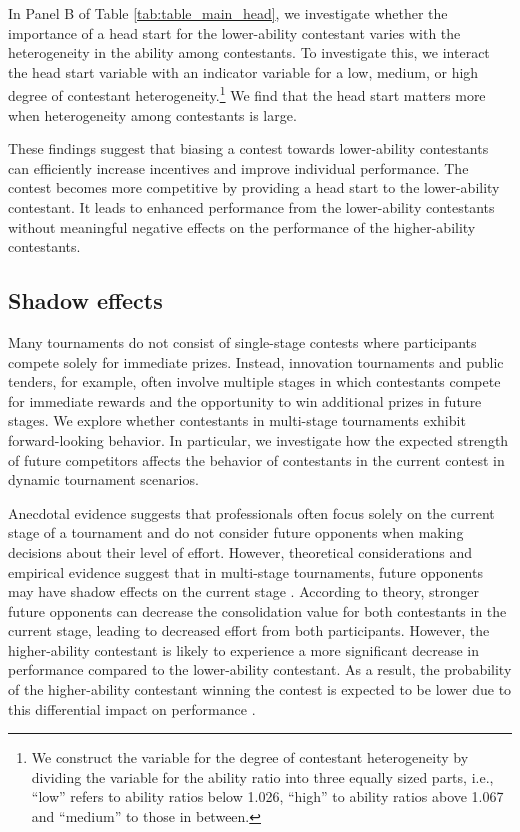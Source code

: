 \documentclass[11pt,a4paper]{article}
\begin{document}
In Panel B of Table \ref{tab:table_main_head}, we investigate whether the importance of a head start for the lower-ability contestant varies with the heterogeneity in the ability among contestants. To investigate this, we interact the head start variable with an indicator variable for a low, medium, or high degree of contestant heterogeneity.\footnote{We construct the variable for the degree of contestant heterogeneity by dividing the variable for the ability ratio into three equally sized parts, i.e., “low” refers to ability ratios below 1.026, “high” to ability ratios above 1.067 and “medium” to those in between.} We find that the head start matters more when heterogeneity among contestants is large.\par

These findings suggest that biasing a contest towards lower-ability contestants can efficiently increase incentives and improve individual performance. The contest becomes more competitive by providing a head start to the lower-ability contestant. It leads to enhanced performance from the lower-ability contestants without meaningful negative effects on the performance of the higher-ability contestants.\par

\subsection{Shadow effects} \label{subsec:spill}

Many tournaments do not consist of single-stage contests where participants compete solely for immediate prizes. Instead, innovation tournaments and public tenders, for example, often involve multiple stages in which contestants compete for immediate rewards and the opportunity to win additional prizes in future stages. We explore whether contestants in multi-stage tournaments exhibit forward-looking behavior. In particular, we investigate how the expected strength of future competitors affects the behavior of contestants in the current contest in dynamic tournament scenarios.\par

Anecdotal evidence suggests that professionals often focus solely on the current stage of a tournament and do not consider future opponents when making decisions about their level of effort. However, theoretical considerations and empirical evidence suggest that in multi-stage tournaments, future opponents may have shadow effects on the current stage \cite{Lackner.2020}. According to theory, stronger future opponents can decrease the consolidation value for both contestants in the current stage, leading to decreased effort from both participants. However, the higher-ability contestant is likely to experience a more significant decrease in performance compared to the lower-ability contestant. As a result, the probability of the higher-ability contestant winning the contest is expected to be lower due to this differential impact on performance \cite{Brown.2014}.\par
\end{document}

